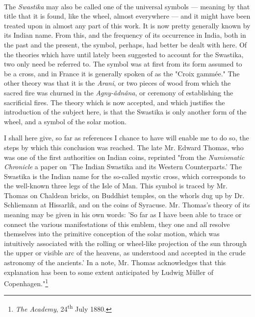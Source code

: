 \documentclass[a4paper, 11pt, oneside, polutonikogreek, english]{article}
\begin{document}
\paragraph{}
The \emph{Swastika} may also be called one of the universal symbols --- meaning by that title that it is found, like the wheel, almost everywhere --- and it might have been treated upon in almost any part of this work. It is now pretty generally known by its Indian name. From this, and the frequency of its occurrence in India, both in the past and the present, the symbol, perhaps, had better be dealt with here. Of the theories which have until lately been suggested to account for the Swastika, two only need be referred to. The symbol was at first from its form assumed to be a cross, and in France it is generally spoken of as the "Croix gammée." The other theory was that it is the \emph{Arani}, or two pieces of wood from which the sacred fire was churned in the \emph{Agny-âdnâna}, or ceremony of establishing the sacrificial fires. The theory which is now accepted, and which justifies the introduction of the subject here, is that the Swastika is only another form of the wheel, and a symbol of the solar motion.

I shall here give, so far as references I chance to have will enable me to do so, the steps by which this conclusion was reached. The late Mr. Edward Thomas, who was one of the first authorities on Indian coins, reprinted "from the \emph{Numismatic Chronicle} a paper on 'The Indian Swastika and its Western Counterparts.' The Swastika is the Indian name for the so-called mystic cross, which corresponds to the well-known three legs of the Isle of Man. This symbol is traced by Mr. Thomas on Chaldean bricks, on Buddhist temples, on the whorls dug up by Dr. Schliemann at Hissarlik, and on the coins of Syracuse. Mr. Thomas's theory of its meaning may be given in his own words: 'So far as I have been able to trace or connect the various manifestations of this emblem, they one and all resolve themselves into the primitive conception of the solar motion, which was intuitively associated with the rolling or wheel-like projection of the sun through the upper or visible arc of the heavens, as understood and accepted in the crude astronomy of the ancients.' In a note, Mr. Thomas acknowledges that this explanation has been to some extent anticipated by Ludwig Müller of Copenhagen."\footnote{\emph{The Academy}, 24\textsuperscript{th} July 1880.}
\end{document}
